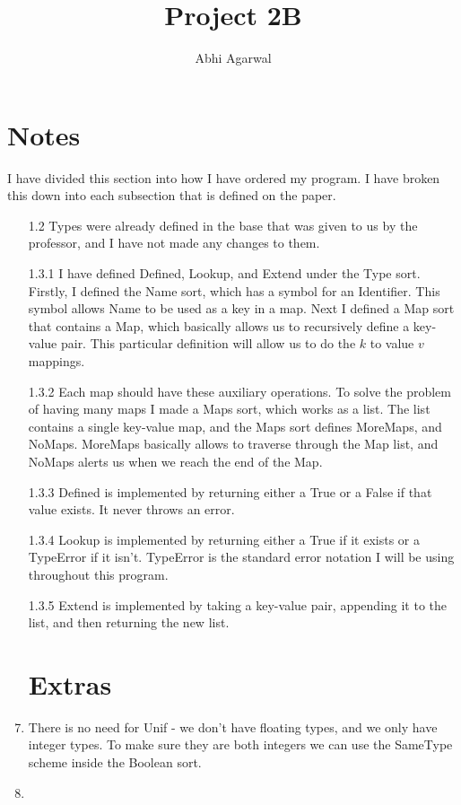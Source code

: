 \documentclass[11pt, oneside]{article}
\title{Project 2B}
\author{Abhi Agarwal}
\date{}
\begin{document}
\maketitle
\section*{Notes}
\par I have divided this section into how I have ordered my program. I have broken this down into each subsection that is defined on the paper. 
\begin{enumerate}
\item[1.2] Types were already defined in the base that was given to us by the professor, and I have not made any changes to them. 
\item[1.3.1] I have defined Defined, Lookup, and Extend under the Type sort. Firstly, I defined the Name sort, which has a symbol for an Identifier. This symbol allows Name to be used as a key in a map. Next I defined a Map sort that contains a Map, which basically allows us to recursively define a key-value pair. This particular definition will allow us to do the $k$ to value $v$ mappings.
\item[1.3.2] Each map should have these auxiliary operations. To solve the problem of having many maps I made a Maps sort, which works as a list. The list contains a single key-value map, and the Maps sort defines MoreMaps, and NoMaps. MoreMaps basically allows to traverse through the Map list, and NoMaps alerts us when we reach the end of the Map. 
\item[1.3.3] Defined is implemented by returning either a True or a False if that value exists. It never throws an error. 
\item[1.3.4] Lookup is implemented by returning either a True if it exists or a TypeError if it isn't. TypeError is the standard error notation I will be using throughout this program. 
\item[1.3.5] Extend is implemented by taking a key-value pair, appending it to the list, and then returning the new list.

\section{Extras}
\item There is no need for Unif - we don't have floating types, and we only have integer types. To make sure they are both integers we can use the SameType scheme inside the Boolean sort.
\item 

\end{enumerate}
\end{document}
